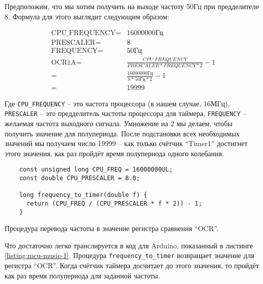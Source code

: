 \documentclass[../sparc.tex]{subfiles}
\begin{document}
Предположим, что мы хотим получить на выходе частоту 50Гц при предделителе 8.
Формула для этого выглядит следующим образом:

\begin{align}
  \mbox{CPU\_FREQUENCY} =& 16000000 \mbox{Гц} \\
  \mbox{PRESCALER} =& 8 \\
  \mbox{FREQUENCY} =& 50 \mbox{Гц} \\
  \mbox{OCR1A} =& \frac{CPU\_FREQUENCY}{PRESCALER * FREQUENCY * 2} - 1 \\
  =& \frac{16000000 \mbox{Гц}}{8 * 50 \mbox{Гц} * 2} - 1 \\
  =& 19999
  \label{equation:mcu-music-1}
\end{align}

Где \texttt{CPU\_FREQUENCY} -- это частота процессора (в нашем случае, 16МГц),
\texttt{PRESCALER} -- это предделитель частоты процессора для таймера,
\texttt{FREQUENCY} -- желаемая частота выходного сигнала.  Умножение на 2 мы
делаем, чтобы получить значение для полупериода.  После подстановки всех
необходимых значений мы получаем число 19999 -- как только счётчик ``Timer1''
достигнет этого значения, как раз пройдёт время полупериода одного колебания.

\begin{listing}[ht]
  \begin{verbatim}
    const unsigned long CPU_FREQ = 16000000UL;
    const double CPU_PRESCALER = 8.0;

    long frequency_to_timer(double f) {
      return (CPU_FREQ / (CPU_PRESCALER * f * 2)) - 1;
    }
  \end{verbatim}
  \caption{Процедура перевода частоты в значение регистра сравнения ``OCR''.}
  \label{listing:mcu-music-1}
\end{listing}

Что достаточно легко транслируется в код для Arduino, показанный в листинге
\ref{listing:mcu-music-1}.  Процедура \texttt{frequency_to_timer}
возвращает значение для регистра ``OCR''.  Когда счётчик таймера досчитает до
этого значения, то пройдёт как раз время полупериода для заданной частоты.
\end{document}
